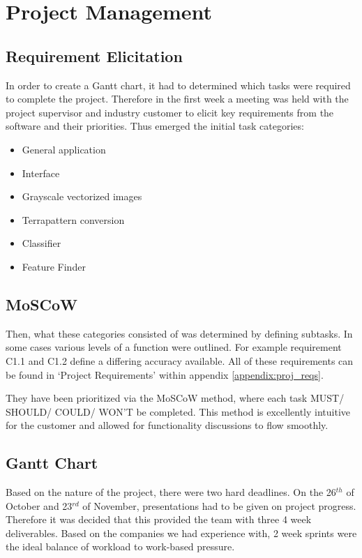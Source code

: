 \section{Project Management}
\subsection{Requirement Elicitation}
In order to create a Gantt chart, it had to determined which tasks were required to complete the project. Therefore in the first week a meeting was held with the project supervisor and industry customer to elicit key requirements from the software and their priorities. Thus emerged the initial task categories:

\begin{itemize}
\item General application
\item Interface
\item Grayscale vectorized images
\item Terrapattern conversion
\item Classifier
\item Feature Finder
\end{itemize}


\newpage
\subsection{MoSCoW}
Then, what these categories consisted of was determined by defining subtasks. In some cases various levels of a function were outlined. For example requirement C1.1 and C1.2 define a differing accuracy available. All of these requirements can be found in `Project Requirements' within appendix \ref{appendix:proj_reqs}. 

They have been prioritized via the MoSCoW method, where each task MUST/ SHOULD/ COULD/ WON'T be completed. This method is excellently intuitive for the customer and allowed for functionality discussions to flow smoothly.


\subsection{Gantt Chart}
Based on the nature of the project, there were two hard deadlines. On the 26$^{th}$ of October and 23$^{rd}$ of November, presentations had to be given on project progress. Therefore it was decided that this provided the team with three 4 week deliverables. Based on the companies we had experience with, 2 week sprints were the ideal balance of workload to work-based pressure.

